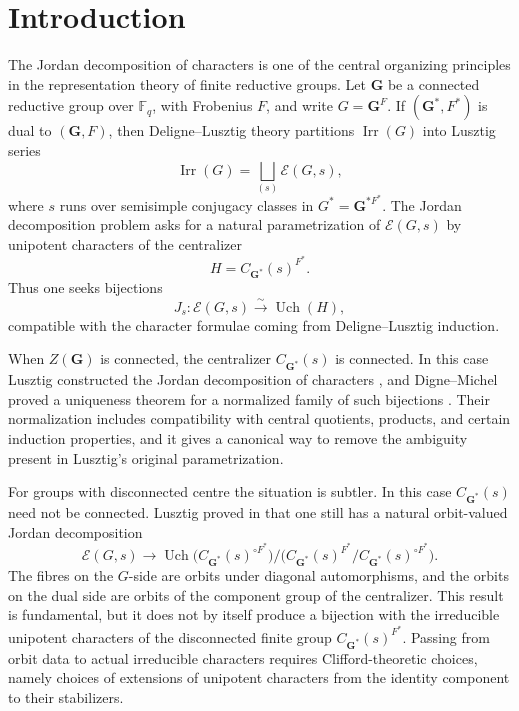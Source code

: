 \documentclass{amsart}
\theoremstyle{plain}
\numberwithin{equation}{section}
\theoremstyle{definition}
\newcommand{\cE}{\mathcal{E}}
\newcommand{\Irr}{\operatorname{Irr}}
\newcommand{\Uch}{\operatorname{Uch}}
\newcommand{\bG}{\mathbf{G}}
\newcommand{\F}{\mathbb{F}}
\begin{document}
\maketitle

\tableofcontents
\section{Introduction}

The Jordan decomposition of characters is one of the central organizing
principles in the representation theory of finite reductive groups.  Let
\(\bG\) be a connected reductive group over \(\F_q\), with Frobenius \(F\), and
write \(G=\bG^F\).  If \((\bG^*,F^*)\) is dual to \((\bG,F)\), then
Deligne--Lusztig theory partitions \(\Irr(G)\) into Lusztig series
\[
\Irr(G)=\bigsqcup_{(s)}\cE(G,s),
\]
where \(s\) runs over semisimple conjugacy classes in \(G^*=\bG^{*F^*}\).
The Jordan decomposition problem asks for a natural parametrization of
\(\cE(G,s)\) by unipotent characters of the centralizer
\[
H=C_{\bG^*}(s)^{F^*}.
\]
Thus one seeks bijections
\[
J_s:\cE(G,s)\xrightarrow{\sim}\Uch(H),
\]
compatible with the character formulae coming from Deligne--Lusztig induction.

When \(Z(\bG)\) is connected, the centralizer \(C_{\bG^*}(s)\) is connected.
In this case Lusztig constructed the Jordan decomposition of characters
\cite{Lus84}, and Digne--Michel proved a uniqueness theorem for a normalized
family of such bijections \cite{DM90}.  Their normalization includes
compatibility with central quotients, products, and certain induction
properties, and it gives a canonical way to remove the ambiguity present in
Lusztig's original parametrization.

For groups with disconnected centre the situation is subtler.  In this case
\(C_{\bG^*}(s)\) need not be connected.  Lusztig proved in \cite{Lus88} that
one still has a natural orbit-valued Jordan decomposition
\[
\cE(G,s)\longrightarrow
\Uch\bigl(C_{\bG^*}(s)^{\circ F^*}\bigr)/
\bigl(C_{\bG^*}(s)^{F^*}/C_{\bG^*}(s)^{\circ F^*}\bigr).
\]
The fibres on the \(G\)-side are orbits under diagonal automorphisms, and the
orbits on the dual side are orbits of the component group of the centralizer.
This result is fundamental, but it does not by itself produce a bijection with
the irreducible unipotent characters of the disconnected finite group
\(C_{\bG^*}(s)^{F^*}\).  Passing from orbit data to actual irreducible
characters requires Clifford-theoretic choices, namely choices of extensions of
unipotent characters from the identity component to their stabilizers.
\end{document}
